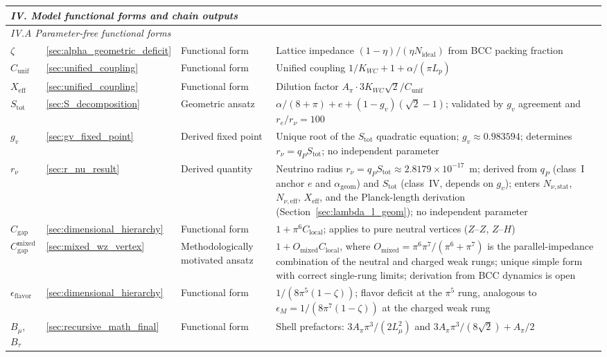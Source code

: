 \documentclass[10pt,a4paper]{article}
\begin{document}
{\begin{longtable}{@{}p{3.2cm}p{1.8cm}p{2.6cm}p{6.0cm}@{}}
		\midrule
		\multicolumn{4}{l}{\textit{IV. Model functional forms and chain outputs}} \\
		\midrule
		\multicolumn{4}{l}{\textit{IV.A Parameter-free functional forms}} \\
		\midrule
		$\zeta$ & \ref{sec:alpha_geometric_deficit} & Functional form & Lattice impedance $(1-\eta)/(\eta N_{\text{ideal}})$ from BCC packing fraction \\
		$C_{\text{unif}}$ & \ref{sec:unified_coupling} & Functional form & Unified coupling $1/K_{WC} + 1 + \alpha/(\pi L_p)$ \\
		$X_{\text{eff}}$ & \ref{sec:unified_coupling} & Functional form & Dilution factor $A_\pi \cdot 3 K_{WC} \sqrt{2}/C_{\text{unif}}$ \\
		$S_{\text{tot}}$ & \ref{sec:S_decomposition} & Geometric ansatz & $\alpha/(8+\pi) + e + (1-g_v)(\sqrt{2}-1)$; validated by $g_v$ agreement and $r_e/r_\nu = 100$ \\
		$g_v$ & \ref{sec:gv_fixed_point} & Derived fixed point & Unique root of the $S_{\text{tot}}$ quadratic equation; $g_v \approx 0.983594$; determines $r_\nu = q_P S_{\text{tot}}$; no independent parameter \\
		$r_\nu$ & \ref{sec:r_nu_result} & Derived quantity & Neutrino radius $r_\nu = q_P S_{\text{tot}} \approx 2.8179 \times 10^{-17}$~m; derived from $q_P$ (class~I anchor $e$ and $\alpha_{\text{geom}}$) and $S_{\text{tot}}$ (class~IV, depends on $g_v$); enters $N_{\nu,\text{stat}}$, $N_{\nu,\text{eff}}$, $X_{\text{eff}}$, and the Planck-length derivation (Section~\ref{sec:lambda_l_geom}); no independent parameter \\
		$C_{\text{gap}}$ & \ref{sec:dimensional_hierarchy} & Functional form & $1 + \pi^6 C_{\text{local}}$; applies to pure neutral vertices ($Z$--$Z$, $Z$--$H$) \\
		$C_{\text{gap}}^{\text{mixed}}$ & \ref{sec:mixed_wz_vertex} & Methodologically motivated ansatz & $1 + O_{\text{mixed}} C_{\text{local}}$, where $O_{\text{mixed}} = \pi^6\pi^7/(\pi^6+\pi^7)$ is the parallel-impedance combination of the neutral and charged weak rungs; unique simple form with correct single-rung limits; derivation from BCC dynamics is open \\
		$\epsilon_{\text{flavor}}$ & \ref{sec:dimensional_hierarchy} & Functional form & $1/(8\pi^5(1-\zeta))$; flavor deficit at the $\pi^5$ rung, analogous to $\epsilon_M = 1/(8\pi^7(1-\zeta))$ at the charged weak rung \\
		$B_\mu$, $B_\tau$ & \ref{sec:recursive_math_final} & Functional form & Shell prefactors: $3 A_\pi \pi^3/(2 L_\mu^2)$ and $3 A_\pi \pi^3/(8\sqrt{2}) + A_\pi/2$ \\

\end{longtable}}
\end{document}
